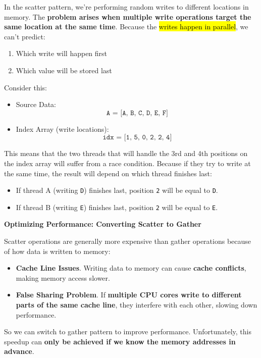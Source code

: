 \highspace
In the scatter pattern, we're performing random writes to different locations in memory. The \textbf{problem arises when multiple write operations target the same location at the same time}. Because the \hl{writes happen in parallel}, we can't predict:
\begin{enumerate}
    \item Which write will happen first
    \item Which value will be stored last
\end{enumerate}

\highspace
\begin{examplebox}
    Consider this:
    \begin{itemize}
        \item Source Data:
        \begin{equation*}
            \texttt{A = [A, B, C, D, E, F]}
        \end{equation*}
        \item Index Array (write locations):
        \begin{equation*}
            \texttt{idx = [1, 5, 0, 2, 2, 4]}
        \end{equation*}
    \end{itemize}
    This means that the two threads that will handle the 3rd and 4th positions on the index array will suffer from a race condition. Because if they try to write at the same time, the result will depend on which thread finishes last:
    \begin{itemize}
        \item If thread A (writing \texttt{D}) finishes last, position \texttt{2} will be equal to \texttt{D}.
        \item If thread B (writing \texttt{E}) finishes last, position \texttt{2} will be equal to \texttt{E}.
    \end{itemize}
\end{examplebox}

\newpage

\begin{flushleft}
    \textcolor{Green3}{\faIcon{\speedIcon} \textbf{Optimizing Performance: Converting Scatter to Gather}}
\end{flushleft}
Scatter operations are generally more expensive than gather operations because of how data is written to memory:
\begin{itemize}[label=\textcolor{Red2}{}]
    \item \textcolor{Red2}{\textbf{Cache Line Issues}}. Writing data to memory can cause \textbf{cache conflicts}, making memory access slower.
    \item \textcolor{Red2}{\textbf{False Sharing Problem}}. If \textbf{multiple CPU cores write to different parts of the same cache line}, they interfere with each other, slowing down performance.
\end{itemize}
So we can switch to gather pattern to improve performance. Unfortunately, this speedup can \textbf{only be achieved if we know the memory addresses in advance}.

